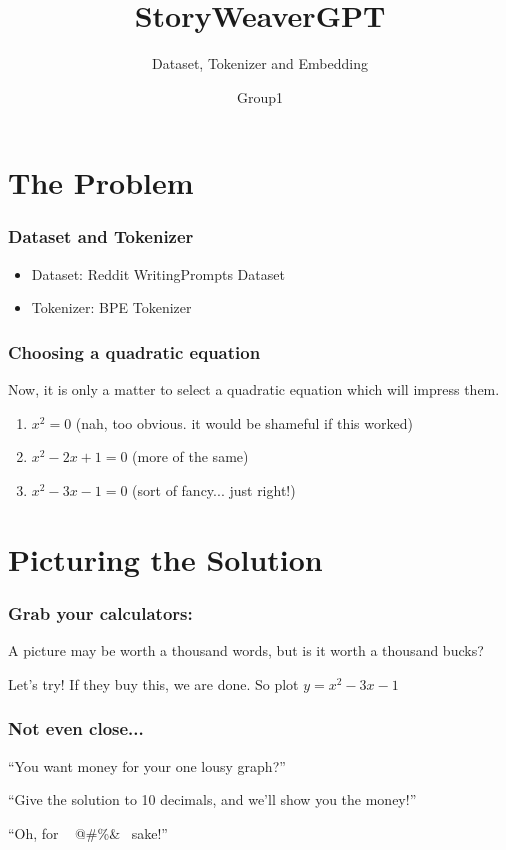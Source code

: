 \documentclass[
    10pt %
    16:9, %
]{beamer}
\title{StoryWeaverGPT}
\subtitle{Dataset, Tokenizer and Embedding}
\author{Group1}
\begin{document}
\frame{\titlepage} %
\section[Outline]{}
\frame{\tableofcontents}

\section{The Problem}
 
 
\frame %
{
  \frametitle{Dataset and Tokenizer}
 
  \begin{itemize}
    \item Dataset: Reddit WritingPrompts Dataset
    \item Tokenizer: BPE Tokenizer
  \end{itemize}
\vfill   
}
 
 \frame %
{
  \frametitle{Choosing a quadratic equation}

Now, it is only a matter to select a quadratic equation which will impress them.

\pause

\begin{enumerate}
\item $x^2  = 0$ \pause (nah, too obvious. it would be shameful if this worked)
\pause 
\item $x^2 -2x +1 = 0$ \pause (more of the same)
\pause
\item $x^2 -3x -1 = 0$ \pause (sort of fancy... just right!)
\end{enumerate}

}


\section{Picturing the Solution}
 
\frame %
{
  \frametitle{Grab your calculators:}
 
 A picture may be worth a thousand words, but is it worth   a thousand bucks?
 
 \medskip
 \pause
 
 Let's try! If they buy this, we are done. So plot $y = x^2 -3x -1$
 
 \pause
 

 
 \vfill   

}

 \frame %
{
  \frametitle{Not even close...}

``You want money for your one lousy graph?''

\pause

\bigskip

``Give the solution to 10 decimals, and we'll show you the money!''

\pause

\bigskip

``Oh, for  ~ @\#\%\*\&\@ ~ sake!''
}
\end{document}
